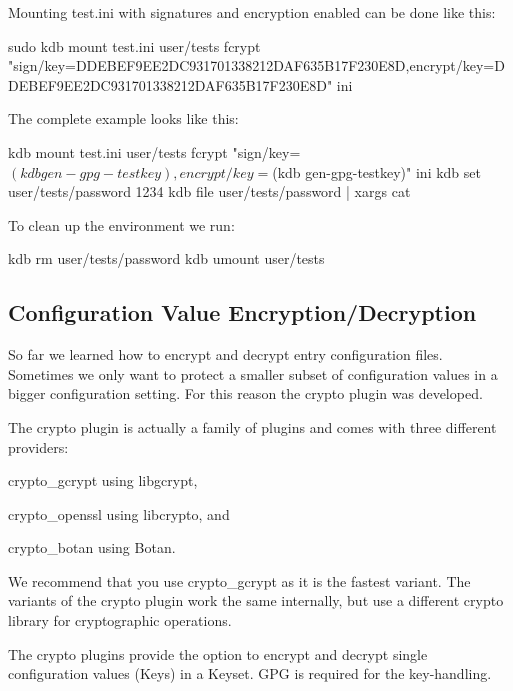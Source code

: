 Mounting {\ttfamily test.\+ini} with signatures and encryption enabled can be done like this\+:


\begin{DoxyCode}
sudo kdb mount test.ini user/tests fcrypt
       "sign/key=DDEBEF9EE2DC931701338212DAF635B17F230E8D,encrypt/key=DDEBEF9EE2DC931701338212DAF635B17F230E8D" ini
\end{DoxyCode}


The complete example looks like this\+:


\begin{DoxyCode}
kdb mount test.ini user/tests fcrypt "sign/key=$(kdb gen-gpg-testkey),encrypt/key=$(kdb gen-gpg-testkey)"
       ini
kdb set user/tests/password 1234
kdb file user/tests/password | xargs cat
\end{DoxyCode}


To clean up the environment we run\+:


\begin{DoxyCode}
kdb rm user/tests/password
kdb umount user/tests
\end{DoxyCode}


\subsection*{Configuration Value Encryption/\+Decryption}

So far we learned how to encrypt and decrypt entry configuration files. Sometimes we only want to protect a smaller subset of configuration values in a bigger configuration setting. For this reason the {\ttfamily crypto} plugin was developed.

The {\ttfamily crypto} plugin is actually a family of plugins and comes with three different providers\+:


\begin{DoxyEnumerate}
\item {\ttfamily crypto\+\_\+gcrypt} using {\ttfamily libgcrypt},
\item {\ttfamily crypto\+\_\+openssl} using {\ttfamily libcrypto}, and
\item {\ttfamily crypto\+\_\+botan} using {\ttfamily Botan}.
\end{DoxyEnumerate}

We recommend that you use {\ttfamily crypto\+\_\+gcrypt} as it is the fastest variant. The variants of the {\ttfamily crypto} plugin work the same internally, but use a different crypto library for cryptographic operations.

The {\ttfamily crypto} plugins provide the option to encrypt and decrypt single configuration values (Keys) in a Keyset. G\+PG is required for the key-\/handling.


